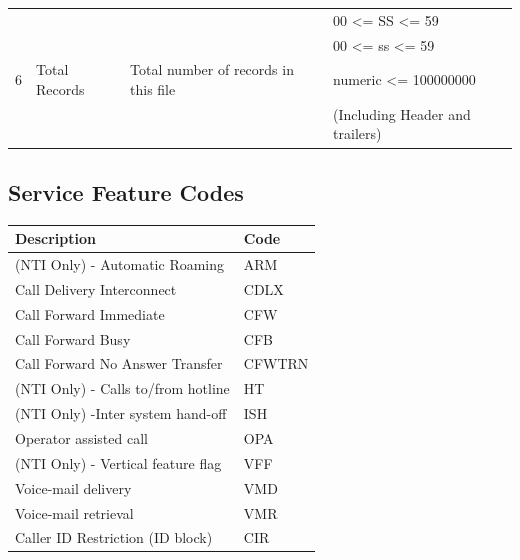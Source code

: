 \documentclass[12pt,twoside]{article}
\begin{document}
\begin{center}
\begin{tabular}{rlll}
                 &                       &                                            &  00 <= SS <= 59                           \\
                 &                       &                                            &  00 <= ss <= 59                           \\
              6  &  Total Records        &  Total number of records in this file      &  numeric <= 100000000                     \\
                 &                       &                                            &  (Including Header and trailers)          \\
\hline
\end{tabular}
\end{center}



\normalsize
\subsection{Service Feature Codes}
\label{sec-7-4}

\footnotesize

\begin{center}
\begin{tabular}{ll}
\hline
 \textbf{Description}                &  \textbf{Code}  \\
\hline
 (NTI Only)  - Automatic Roaming     &  ARM            \\
 Call Delivery Interconnect          &  CDLX           \\
 Call Forward Immediate              &  CFW            \\
 Call Forward Busy                   &  CFB            \\
 Call Forward No Answer Transfer     &  CFWTRN         \\
 (NTI Only) - Calls to/from hotline  &  HT             \\
 (NTI Only) -Inter system hand-off   &  ISH            \\
 Operator assisted call              &  OPA            \\
 (NTI Only) - Vertical feature flag  &  VFF            \\
 Voice-mail delivery                 &  VMD            \\
 Voice-mail retrieval                &  VMR            \\
 Caller ID Restriction (ID block)    &  CIR            \\
\hline
\end{tabular}
\end{center}
\end{document}
